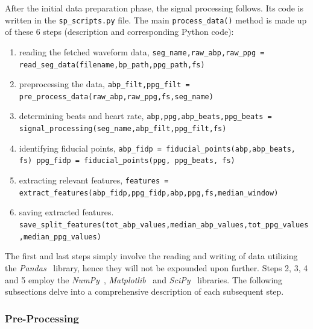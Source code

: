After the initial data preparation phase, the signal processing follows.
Its code is written in the \texttt{sp\_scripts.py} file.
The main \texttt{process\_data()} method is made up of these 6 steps (description and corresponding Python code):
\begin{enumerate}
    \setlength{\itemsep}{-0.2\parsep}
    \item reading the fetched waveform data, \newline
    \small \texttt{seg\_name,raw\_abp,raw\_ppg = read\_seg\_data(filename,bp\_path,ppg\_path,fs)}
    \item \normalsize preprocessing the data, \newline
    \small \texttt{abp\_filt,ppg\_filt = pre\_process\_data(raw\_abp,raw\_ppg,fs,seg\_name)}
    \item \normalsize determining beats and heart rate, \newline
    \small \texttt{abp,ppg,abp\_beats,ppg\_beats = signal\_processing(seg\_name,abp\_filt,ppg\_filt,fs)}
    \item \normalsize identifying fiducial points, \newline
    \small \texttt{abp\_fidp = fiducial\_points(abp,abp\_beats, fs) \newline ppg\_fidp = fiducial\_points(ppg, ppg\_beats, fs)}
    \item \normalsize extracting relevant features, \newline
    \small \texttt{features = extract\_features(abp\_fidp,ppg\_fidp,abp,ppg,fs,median\_window)}
    \item \normalsize saving extracted features. \newline
    \small \texttt{save\_split\_features(tot\_abp\_values,median\_abp\_values,tot\_ppg\_values,median\_ppg\_values)}
\end{enumerate}

The first and last steps simply involve the reading and writing of data utilizing the \textit{Pandas}~\cite{PandasPythonData} library, hence they will not be expounded upon further.
Steps 2, 3, 4 and 5 employ the \textit{NumPy}~\cite{NumPy}, \textit{Matplotlib}~\cite{MatplotlibVisualizationPython} and \textit{SciPy}~\cite{SciPy} libraries.
The following subsections delve into a comprehensive description of each subsequent step.

\subsubsection{Pre-Processing}
\label{subsubsec:filtering}

